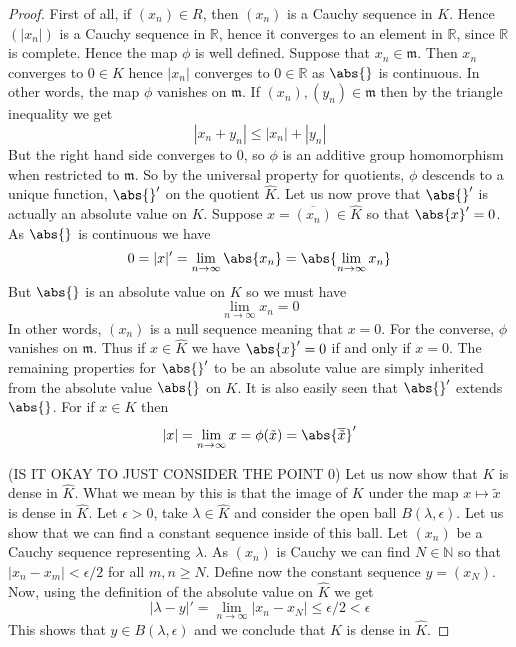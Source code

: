 \documentclass{article}
\newcommand{\mfrak}[1]{\mathfrak{#1}}
\newcommand{\mbb}[1]{\mathbb{#1}}
\begin{document}
\begin{proof}
    First of all, if $(x_n) \in R$, then $(x_n)$ is a Cauchy sequence in $K$. Hence  $(|x_n|)$ is a Cauchy sequence in $\mbb R$, hence it converges to an element in $\mbb R$, since $\mbb R$ is complete. Hence the map $\phi$ is well defined. Suppose that $x_n \in \mfrak m$. Then $x_n$ converges to $0 \in K$ hence $|x_n|$ converges to $0 \in \mbb R$ as $\abs{}$ is continuous. In other words, the map $\phi$ vanishes on $\mfrak m$. If $(x_n), (y_n) \in \mfrak m$ then by the triangle inequality we get 
    $$|x_n + y_n| \leq |x_n| + |y_n|$$
    But the right hand side converges to 0, so $\phi$ is an additive group homomorphism when restricted to $\mfrak m$. So by the universal property for quotients, $\phi$ descends to a unique function, $\abs{}'$ on the quotient $\hat K$. Let us now prove that $\abs{}'$ is actually an absolute value on $K$. Suppose $x = \overline {(x_n)} \in \hat K$ so that $\abs{x}' = 0$. As $\abs{}$ is continuous we have
    $$0 = |x|' = \lim_{n \to \infty} \abs{x_n} =  \abs {\lim_{n \to \infty} x_n}$$
    But $\abs{}$ is an absolute value on $K$ so we must have 
    $$\lim_{n \to \infty} x_n = 0$$
    In other words, $(x_n)$ is a null sequence meaning that $x = 0$. For the converse, $\phi$ vanishes on $\mfrak m$. Thus if $x \in \hat K$ we have $\abs{x}' = 0$ if and only if $x = 0$. The remaining properties for $\abs{}'$ to be an absolute value are simply inherited from the absolute value $\abs{}$ on $K$. It is also easily seen that $\abs{}'$ extends $\abs{}$. For if $x \in K$ then 
    $$|x| = \lim_{n \to \infty} x = \phi(\tilde x) = \abs{\overline{ \tilde {x}}}'$$

    (IS IT OKAY TO JUST CONSIDER THE POINT 0)
    Let us now show that $K$ is dense in $\hat K$. What we mean by this is that the image of $K$ under the map $x \mapsto \tilde x$ is dense in $\hat K$. Let $\epsilon > 0$, take $\lambda \in \hat K$ and consider the open ball $B(\lambda, \epsilon)$. Let us show that we can find a constant sequence inside of this ball. Let $(x_n)$ be a Cauchy sequence representing $\lambda$. As $(x_n)$ is Cauchy we can find $N \in \mbb N$ so that $|x_n - x_m| < \epsilon / 2$ for all $m,n \geq N$. Define now the constant sequence $y = (x_N)$. Now, using the definition of the absolute value on $\hat K$ we get
    $$|\lambda - y|' = \lim_{n \to \infty} |x_n - x_N| \leq \epsilon/2 < \epsilon$$
    This shows that $y \in B(\lambda, \epsilon)$ and we conclude that $K$ is dense in $\hat K$.
    

\end{proof}
\end{document}
